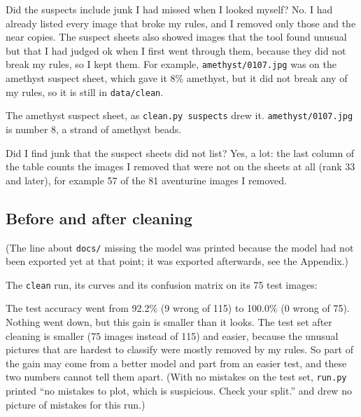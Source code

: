 \documentclass[11pt]{article}
\begin{document}
Did the suspects include junk I had missed when I looked myself? No. I had
already listed every image that broke my rules, and I removed only those and the
near copies. The suspect sheets also showed images that the tool found unusual
but that I had judged ok when I first went through them, because they did not
break my rules, so I kept them. For example, \texttt{amethyst/0107.jpg} was on
the amethyst suspect sheet, which gave it 8\% amethyst, but it did not break any
of my rules, so it is still in \texttt{data/clean}.


{\small The amethyst suspect sheet, as \texttt{clean.py suspects} drew it.
\texttt{amethyst/0107.jpg} is number 8, a strand of amethyst beads.}

Did I find junk that the suspect sheets did not list? Yes, a lot: the last column
of the table counts the images I removed that were not on the sheets at all
(rank 33 and later), for example 57 of the 81 aventurine images I removed.

\subsection*{Before and after cleaning}

(The line about \texttt{docs/} missing the model was printed because the model
had not been exported yet at that point; it was exported afterwards, see the
Appendix.)

The \texttt{clean} run, its curves and its confusion matrix on its 75 test
images:

\begin{center}\end{center}


The test accuracy went from 92.2\% (9 wrong of 115) to 100.0\% (0 wrong of 75).
Nothing went down, but this gain is smaller than it looks. The test set after
cleaning is smaller (75 images instead of 115) and easier, because the unusual
pictures that are hardest to classify were mostly removed by my rules. So part of
the gain may come from a better model and part from an easier test, and these two
numbers cannot tell them apart. (With no mistakes on the test set,
\texttt{run.py} printed ``no mistakes to plot, which is suspicious. Check your
split.'' and drew no picture of mistakes for this run.)
\end{document}
